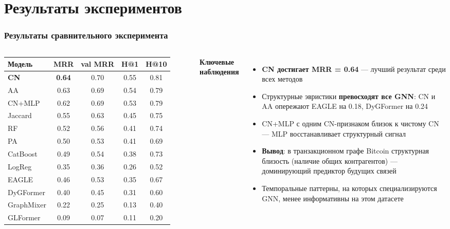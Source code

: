 \documentclass[aspectratio=169]{beamer}
\begin{document}
\section{Результаты экспериментов}
\begin{frame}
  \frametitle{Результаты сравнительного эксперимента}
  \begin{columns}[T]
    \centering
    \small
    \begin{tabular}{lcccc}
      \toprule
      \textbf{Модель} & \textbf{MRR} & \textbf{val MRR} & \textbf{H@1} & \textbf{H@10} \\
      \midrule
      \textbf{CN} & \textbf{0.64} & 0.70 & 0.55 & 0.81 \\
      AA & 0.63 & 0.69 & 0.54 & 0.79 \\
      CN+MLP & 0.62 & 0.69 & 0.53 & 0.79 \\
      Jaccard & 0.55 & 0.63 & 0.45 & 0.75 \\
      RF & 0.52 & 0.56 & 0.41 & 0.74 \\
      PA & 0.50 & 0.53 & 0.41 & 0.69 \\
      CatBoost & 0.49 & 0.54 & 0.38 & 0.73 \\
      LogReg & 0.35 & 0.36 & 0.26 & 0.52 \\
      \midrule
      EAGLE & 0.46 & 0.53 & 0.35 & 0.67 \\
      DyGFormer & 0.40 & 0.45 & 0.31 & 0.60 \\
      GraphMixer & 0.22 & 0.25 & 0.13 & 0.40 \\
      GLFormer & 0.09 & 0.07 & 0.11 & 0.20 \\
      \bottomrule
    \end{tabular}
    \textbf{Ключевые наблюдения}
    \begin{itemize}
      \item \textbf{CN достигает MRR = 0.64} — лучший результат среди всех методов
      \item Структурные эвристики \textbf{превосходят все GNN}: CN и AA опережают EAGLE на 0.18, DyGFormer на 0.24
      \item CN+MLP с одним CN-признаком близок к чистому CN — MLP восстанавливает структурный сигнал
      \item \textbf{Вывод}: в транзакционном графе Bitcoin структурная близость (наличие общих контрагентов) — доминирующий предиктор будущих связей
      \item Темпоральные паттерны, на которых специализируются GNN, менее информативны на этом датасете
    \end{itemize}
  \end{columns}
\end{frame}
\end{document}
